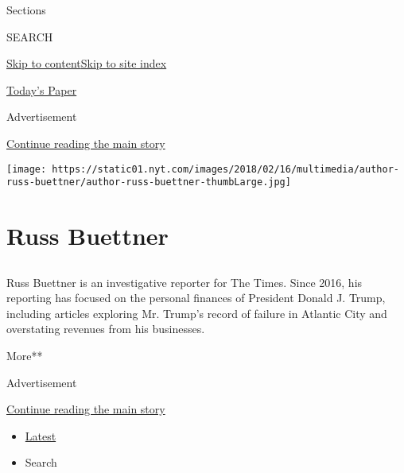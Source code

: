 Sections

SEARCH

\protect\hyperlink{site-content}{Skip to
content}\protect\hyperlink{site-index}{Skip to site index}

\href{https://myaccount.nytimes.com/auth/login?response_type=cookie\&client_id=vi}{}

\href{https://www.nytimes.com/section/todayspaper}{Today's Paper}

Advertisement

\protect\hyperlink{after-top}{Continue reading the main story}

\texttt{[image: https://static01.nyt.com/images/2018/02/16/multimedia/author-russ-buettner/author-russ-buettner-thumbLarge.jpg]}

\hypertarget{russ-buettner}{%
\section{Russ Buettner}\label{russ-buettner}}

\subsection{}

Russ Buettner is an investigative reporter for The Times. Since 2016,
his reporting has focused on the personal finances of President Donald
J. Trump, including articles exploring Mr. Trump's record of failure in
Atlantic City and overstating revenues from his businesses.

More**

Advertisement

\protect\hyperlink{after-mid1}{Continue reading the main story}

\begin{itemize}
\tightlist
\item
  \protect\hyperlink{stream-panel}{Latest}
\item
  Search
\end{itemize}

